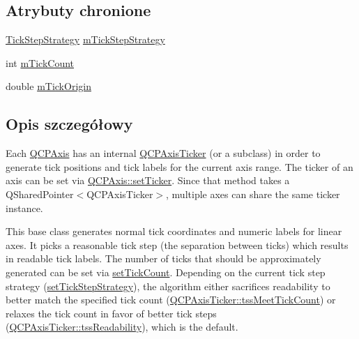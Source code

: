 \subsection*{Atrybuty chronione}
\begin{DoxyCompactItemize}
\item 
\hyperlink{class_q_c_p_axis_ticker_ab6d2f9d9477821623ac9bc4b21ddf49a}{Tick\+Step\+Strategy} \hyperlink{class_q_c_p_axis_ticker_ac059d6d670b2f6132c593fb4de156701}{m\+Tick\+Step\+Strategy}
\item 
int \hyperlink{class_q_c_p_axis_ticker_a14a35b47d1aad11b08d18ea0e25937b8}{m\+Tick\+Count}
\item 
double \hyperlink{class_q_c_p_axis_ticker_a560ef9347b1aa599a9bf0e2f29d3ec16}{m\+Tick\+Origin}
\end{DoxyCompactItemize}


\subsection{Opis szczegółowy}
Each \hyperlink{class_q_c_p_axis}{Q\+C\+P\+Axis} has an internal \hyperlink{class_q_c_p_axis_ticker}{Q\+C\+P\+Axis\+Ticker} (or a subclass) in order to generate tick positions and tick labels for the current axis range. The ticker of an axis can be set via \hyperlink{class_q_c_p_axis_a4ee03fcd2c74d05cd1a419b9af5cfbdc}{Q\+C\+P\+Axis\+::set\+Ticker}. Since that method takes a {\ttfamily Q\+Shared\+Pointer$<$\+Q\+C\+P\+Axis\+Ticker$>$}, multiple axes can share the same ticker instance.

This base class generates normal tick coordinates and numeric labels for linear axes. It picks a reasonable tick step (the separation between ticks) which results in readable tick labels. The number of ticks that should be approximately generated can be set via \hyperlink{class_q_c_p_axis_ticker_a47752abba8293e6dc18491501ae34008}{set\+Tick\+Count}. Depending on the current tick step strategy (\hyperlink{class_q_c_p_axis_ticker_a73b1d847c1a12159af6bfda4ebebe7d5}{set\+Tick\+Step\+Strategy}), the algorithm either sacrifices readability to better match the specified tick count (\hyperlink{class_q_c_p_axis_ticker_ab6d2f9d9477821623ac9bc4b21ddf49aa770312b6b9b0c64a37ceeba96e0cd7f2}{Q\+C\+P\+Axis\+Ticker\+::tss\+Meet\+Tick\+Count}) or relaxes the tick count in favor of better tick steps (\hyperlink{class_q_c_p_axis_ticker_ab6d2f9d9477821623ac9bc4b21ddf49aa9002aa2fd5633ab5556c71a26fed63a8}{Q\+C\+P\+Axis\+Ticker\+::tss\+Readability}), which is the default.

